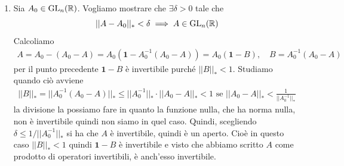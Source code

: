 \documentclass[a4paper]{article}
\begin{document}
\begin{snippetproof}{}
\begin{enumerate}
        Calcoliamo quindi \(||B \circ A||_*\)
        con \(A,B\) operatori lineari, e usando la norma operatoriale.
        Siccome abbiamo la norma operatoriale vale la stima fondamentale
        \begin{align*}
            ||(B\circ A) x|| &= ||B(Ax)|| \leq ||B||_* ||Ax|| \leq ||B||_* ||A||_* ||x||
        \end{align*}
        Siccome la norma operatoriale è la più piccola costante per cui vale una stima del tipo dato.
        Quindi \(||B \circ A||_* \leq ||B||_* ||A||_*\).
        Quindi in particolare \(||B^k||_* \leq {||B||_*}^k\).
        Tornando a prima otteniamo
        \begin{align*}
            \left|\left|
                \sum_{k=m}^{m+p} B^k
            \right|\right|_* \leq
            \sum_{k=m}^{m+p} ||B^k||_*
            \leq \sum_{k=m}^{m+p} {(||B||_*)}^k \leq \varepsilon
        \end{align*}
        pur di considerare \(||B||_* < 1\).
        \item Sia \(A_0 \in \text{GL}_n(\mathbb{R})\).
        Vogliamo mostrare che \(\exists \delta > 0\) tale che
        \[
            ||A-A_0||_* < \delta \implies A \in \text{GL}_n(\mathbb{R})
        \]
        Calcoliamo
        \begin{align*}
            A = A_0 - (A_0 - A) = A_0 (\mathbf{1} - A_0^{-1}(A_0 - A))
            = A_0 (\mathbf{1} - B), \quad B = A_0^{-1}(A_0 - A)
        \end{align*}
        per il punto precedente \(\mathbf{1} - B\) è invertibile purché \(||B||_* < 1\).
        Studiamo quando ciò avviene
        \begin{align*}
            ||B||_* = ||A_0^{-1}(A_0 - A)||_* \leq ||A_0^{-1}||_* \cdot ||A_0 - A||_* < 1
            \text{ se } ||A_0 - A||_* < \frac{1}{||A_0^{-1}||_*}
        \end{align*}
        la divisione la possiamo fare in quanto la funzione nulla, che ha norma nulla, non è invertibile quindi non siamo
        in quel caso.
        Quindi, scegliendo \(\delta \leq 1 / ||A_0^{-1}||_*\)
        si ha che \(A\) è invertibile, quindi è un aperto.
        Cioè in questo caso \(||B||_* < 1\) quindi \(\mathbf{1} - B\) è invertibile
        e visto che abbiamo scritto \(A\) come prodotto di operatori invertibili, è anch'esso invertibile.
    \end{enumerate}


\end{snippetproof}
\end{document}
